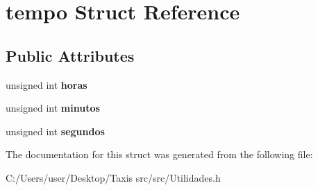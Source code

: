 \hypertarget{structtempo}{}\section{tempo Struct Reference}
\label{structtempo}
\subsection*{Public Attributes}
\begin{DoxyCompactItemize}
\item 
\mbox{\label{structtempo_af07a6c5c7f27e3b596465ec4d386dd98}} 
unsigned int {\bfseries horas}
\item 
\mbox{\label{structtempo_aae3067bdb5661fc78b9b5cbf7f806509}} 
unsigned int {\bfseries minutos}
\item 
\mbox{\label{structtempo_ac8b581153430a11ec9c573062efb928f}} 
unsigned int {\bfseries segundos}
\end{DoxyCompactItemize}


The documentation for this struct was generated from the following file\+:\begin{DoxyCompactItemize}
\item 
C\+:/\+Users/user/\+Desktop/\+Taxis src/src/Utilidades.\+h\end{DoxyCompactItemize}
